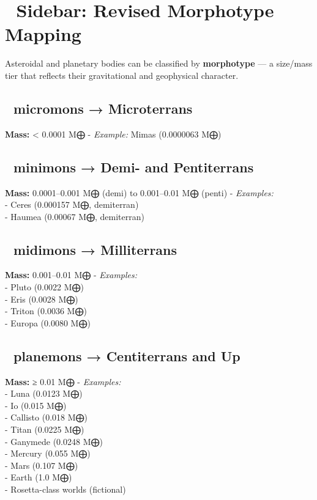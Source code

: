 \documentclass[
  letterpaper,
]{book}
\begin{document}
\section{📎 Sidebar: Revised Morphotype
Mapping}\label{sidebar-revised-morphotype-mapping}

Asteroidal and planetary bodies can be classified by \textbf{morphotype}
--- a size/mass tier that reflects their gravitational and geophysical
character.

\subsection{\texorpdfstring{🔹 \textbf{micromons} →
Microterrans}{🔹 micromons → Microterrans}}\label{micromons-microterrans}

\textbf{Mass:} \textless{} 0.0001 M⨁ - \emph{Example:} Mimas (0.0000063
M⨁)

\subsection{\texorpdfstring{🔹 \textbf{minimons} → Demi- and
Pentiterrans}{🔹 minimons → Demi- and Pentiterrans}}\label{minimons-demi--and-pentiterrans}

\textbf{Mass:} 0.0001--0.001 M⨁ (demi) to 0.001--0.01 M⨁ (penti) -
\emph{Examples:}\\
- Ceres (0.000157 M⨁, demiterran)\\
- Haumea (0.00067 M⨁, demiterran)

\subsection{\texorpdfstring{🔹 \textbf{midimons} →
Milliterrans}{🔹 midimons → Milliterrans}}\label{midimons-milliterrans}

\textbf{Mass:} 0.001--0.01 M⨁ - \emph{Examples:}\\
- Pluto (0.0022 M⨁)\\
- Eris (0.0028 M⨁)\\
- Triton (0.0036 M⨁)\\
- Europa (0.0080 M⨁)

\subsection{\texorpdfstring{🔹 \textbf{planemons} → Centiterrans and
Up}{🔹 planemons → Centiterrans and Up}}\label{planemons-centiterrans-and-up}

\textbf{Mass:} ≥ 0.01 M⨁ - \emph{Examples:}\\
- Luna (0.0123 M⨁)\\
- Io (0.015 M⨁)\\
- Callisto (0.018 M⨁)\\
- Titan (0.0225 M⨁)\\
- Ganymede (0.0248 M⨁)\\
- Mercury (0.055 M⨁)\\
- Mars (0.107 M⨁)\\
- Earth (1.0 M⨁)\\
- Rosetta-class worlds (fictional)
\end{document}
